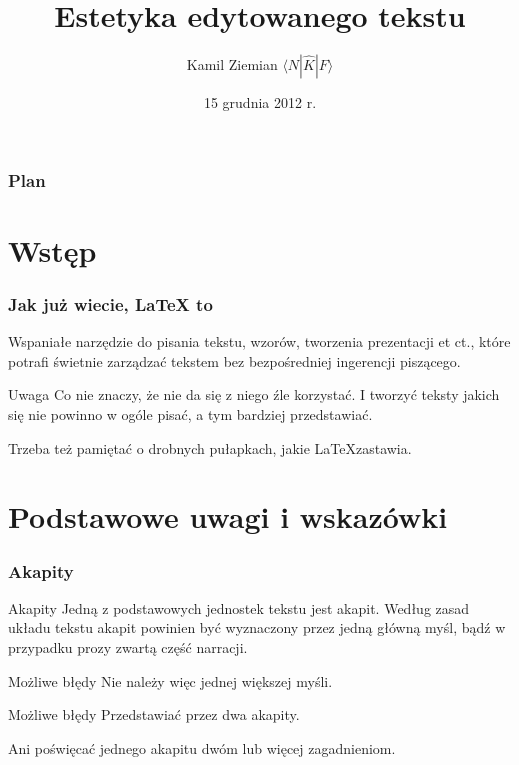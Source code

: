 \documentclass{beamer}
\title[Estetyka edytowanego tekstu]{Estetyka edytowanego tekstu}
\author{Kamil Ziemian \newline $\langle N | \widehat{ K } | F \rangle$}
\date[15.12.2012]{15 grudnia 2012 r.}
\begin{document}
\begin{frame}
\titlepage
\end{frame}

\begin{frame}
\frametitle{Plan}
\tableofcontents
\end{frame}



\section{Wstęp}



\begin{frame}
\frametitle{Jak już wiecie, \LaTeX { to}}
\pause


\begin{block}{}
Wspaniałe narzędzie do pisania tekstu, wzorów, tworzenia prezentacji et ct.,
które potrafi świetnie zarządzać tekstem \linebreak bez bezpośredniej ingerencji piszącego.
\end{block}
\pause

\begin{block}{Uwaga}
\pause
Co nie \newline
znaczy, że nie da się z niego źle \linebreak korzystać.
\pause
I tworzyć teksty jakich się nie powinno w ogóle pisać, a tym bardziej przedstawiać.
\end{block}
\pause

\begin{block}
Trzeba też pamiętać o drobnych pułapkach, jakie \LaTeX zastawia.
\end{block}

\end{frame}



\section{Podstawowe uwagi i wskazówki}

\begin{frame}
\frametitle{Akapity}


\begin{block}{Akapity}
Jedną z podstawowych jednostek tekstu jest akapit. Według zasad układu tekstu akapit powinien być wyznaczony przez jedną
główną myśl, bądź w przypadku prozy zwartą część narracji. 
\end{block}
\pause

\begin{block}{Możliwe błędy}
Nie należy więc jednej większej myśli.
\end{block}
\pause

\begin{block}{Możliwe błędy}
Przedstawiać przez dwa akapity.
\end{block}

\begin{block}{}
Ani poświęcać jednego akapitu dwóm lub więcej zagadnieniom.
\end{block}

\end{frame}
\end{document}
